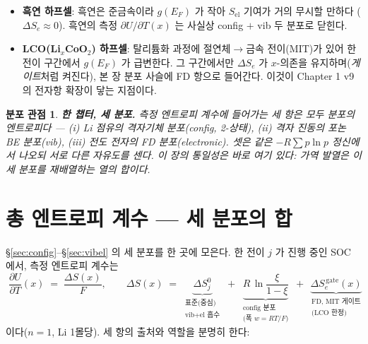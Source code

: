 \documentclass[11pt,a4paper]{article}
\newtheorem*{distbox}{분포 관점}
\newcommand{\elec}{\mathrm{el}}
\begin{document}
\begin{itemize}[leftmargin=1.4em,itemsep=2pt]
\item \textbf{흑연 하프셀}: 흑연은 준금속이라 $g(E_F)$ 가 작아 $S_\elec$ 기여가 거의 무시할 만하다
($\Delta S_e\approx0$). 흑연의 측정 $\partial U/\partial T(x)$ 는 사실상 config $+$ vib 두 분포로 닫힌다.
\item \textbf{LCO(Li$_x$CoO$_2$) 하프셀}: 탈리튬화 과정에 절연체$\to$금속 전이(MIT)가 있어 한 전이
구간에서 $g(E_F)$ 가 급변한다. 그 구간에서만 $\Delta S_e$ 가 $x$-의존을 유지하며(\emph{게이트}처럼
켜진다), 본 장 분포 사슬에 FD 항으로 들어간다. 이것이 Chapter 1 v9 의 전자항 확장이 닿는 지점이다.
\end{itemize}

\begin{distbox}
\textbf{한 챕터, 세 분포.} 측정 엔트로피 계수에 들어가는 세 항은 모두 \emph{분포의 엔트로피}다 —
(i) Li 점유의 격자기체 분포(config, 2-상태), (ii) 격자 진동의 포논 BE 분포(vib), (iii) 전도 전자의
FD 분포(electronic). 셋은 같은 $-R\sum p\ln p$ 정신에서 나오되 서로 다른 자유도를 센다. 이 장의 통일성은
바로 여기 있다: \emph{가역 발열은 이 세 분포를 재배열하는 열의 합}이다.
\end{distbox}

\section{총 엔트로피 계수 — 세 분포의 합}\label{sec:total}
\S\ref{sec:config}--\S\ref{sec:vibel} 의 세 분포를 한 곳에 모은다. 한 전이 $j$ 가 진행 중인 SOC 에서,
측정 엔트로피 계수는
\begin{equation}
\boxed{\;
\frac{\partial U}{\partial T}(x)\;=\;\frac{\Delta S(x)}{F},
\qquad
\Delta S(x)\;=\;
\underbrace{\Delta S^0_j}_{\substack{\text{표준(중심)}\\ \text{vib+el 흡수}}}
\;+\;
\underbrace{R\,\ln\frac{\xi}{1-\xi}}_{\substack{\text{config 분포}\\ \text{(폭 }w=RT/F)}}
\;+\;
\underbrace{\Delta S_e^{\,\mathrm{gate}}(x)}_{\substack{\text{FD, MIT 게이트}\\ \text{(LCO 한정)}}}
\;}
\label{eq:master}
\end{equation}
이다($n=1$, Li 1몰당). 세 항의 출처와 역할을 분명히 한다:
\end{document}
